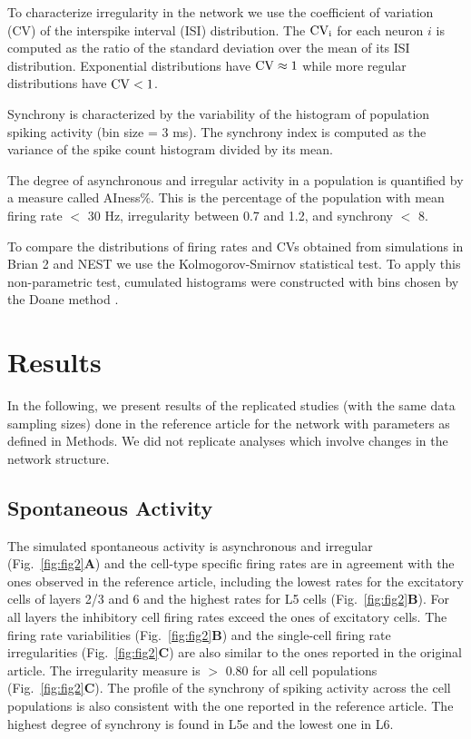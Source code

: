 \documentclass[10pt,a4paper,onecolumn]{article}
\begin{document}
To characterize irregularity in the network we use the coefficient of variation (CV) of the interspike interval (ISI) distribution. The $\rm CV_{\rm i}$ for each neuron $i$ is computed as the ratio of the standard deviation over the mean of its ISI distribution. Exponential distributions have $\rm CV \approx 1$ while more regular distributions have $\rm CV<1$. 

Synchrony is characterized by the variability of the histogram of population spiking activity (bin size = 3 ms). The synchrony index is computed as the variance of the spike count histogram divided by its mean.

The degree of asynchronous and irregular activity in a population is quantified by a measure called AIness\%. This is the percentage of the population with mean firing rate $<$ 30 Hz, irregularity between 0.7 and 1.2, and synchrony $<$ 8. 

To compare the distributions of firing rates and CVs obtained from simulations in Brian 2 and NEST we use the Kolmogorov-Smirnov statistical test. To apply this non-parametric test, cumulated histograms were constructed with bins chosen by the Doane method \cite{doane1976}.

\section{Results}\label{results}

In the following, we present results of the replicated studies (with the same data sampling sizes) done in the reference article for the network with parameters as defined in Methods. We did not replicate analyses which involve changes in the network structure.

\subsection{Spontaneous Activity}
The simulated spontaneous activity is asynchronous and irregular (Fig.~\ref{fig:fig2}\textbf{A}) and the cell-type specific firing rates are in agreement with the ones observed in the reference article, including the lowest rates for the excitatory cells of layers 2/3 and 6 and the highest rates for L5 cells (Fig.~\ref{fig:fig2}\textbf{B}). For all layers the inhibitory cell firing rates exceed the ones of excitatory cells. The firing rate variabilities (Fig.~\ref{fig:fig2}\textbf{B}) and the single-cell firing rate irregularities (Fig.~\ref{fig:fig2}\textbf{C}) are also similar to the ones reported in the original article. The irregularity measure is $>$ 0.80 for all cell populations (Fig.~\ref{fig:fig2}\textbf{C}). The profile of the synchrony of spiking activity across the cell populations is also consistent with the one reported in the reference article. The highest degree of synchrony is found in L5e and the lowest one in L6. 
\end{document}
